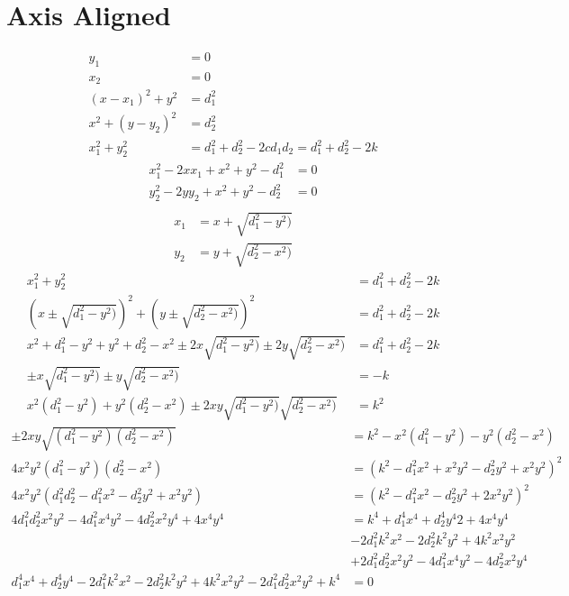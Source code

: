 \documentclass{article}
\begin{document}
\section{Axis Aligned}
\begin{align*}
  y_1 & = 0\\
  x_2 & = 0\\
  (x - x_1)^2 + y^2 &= d_1^2\\
  x^2 + (y - y_2)^2 &= d_2^2\\
  x_1^2 + y_2^2 &= d_1^2 + d_2^2 - 2 c d_1 d_2 = d_1^2 + d_2^2 - 2 k
\end{align*}
\begin{align*}
  x_1^2 - 2 x x_1 + x^2 + y^2 - d_1^2 &= 0\\
  y_2^2 - 2 y y_2 + x^2 + y^2 - d_2^2 &= 0\\
\end{align*}
\begin{align*}
  x_1 &= x + \sqrt{d_1^2 - y^2)}\\
  y_2 &= y + \sqrt{d_2^2 - x^2)}
\end{align*}
\begin{align*}
  x_1^2 + y_2^2 &= d_1^2 + d_2^2 - 2 k\\
  (x \pm \sqrt{d_1^2 - y^2)})^2 + (y \pm \sqrt{d_2^2 - x^2)})^2 &= d_1^2 + d_2^2 - 2 k\\
  x^2 + d_1^2 - y^2 + y^2 + d_2^2 - x^2 \pm 2 x \sqrt{d_1^2 - y^2)} \pm 2 y \sqrt{d_2^2 - x^2)} &= d_1^2 + d_2^2 - 2 k\\
  \pm x \sqrt{d_1^2 - y^2)} \pm y \sqrt{d_2^2 - x^2)} &= -k\\
  x^2 (d_1^2 - y^2) + y^2 (d_2^2 - x^2) \pm 2 x y \sqrt{d_1^2 - y^2)} \sqrt{d_2^2 - x^2)} &= k^2
\end{align*}
\begin{align*}
  \pm 2 x y \sqrt{(d_1^2 - y^2)(d_2^2 - x^2)} &= k^2 - x^2 (d_1^2 - y^2) - y^2 (d_2^2 - x^2)\\
  4 x^2 y^2 (d_1^2 - y^2)(d_2^2 - x^2) &= (k^2 - d_1^2x^2 + x^2y^2 - d_2^2y^2 + x^2y^2)^2\\
  4 x^2 y^2 (d_1^2d_2^2 - d_1^2x^2 - d_2^2y^2 + x^2y^2) &= (k^2 - d_1^2 x^2 - d_2^2 y^2 + 2 x^2 y^2)^2\\
  4 d_1^2d_2^2 x^2 y^2 - 4 d_1^2 x^4 y^2 - 4 d_2^2 x^2 y^4 + 4 x^4 y^4  &= k^4 + d_1^4 x^4 + d_2^4 y^4 2 + 4 x^4 y^4 \\
                                                                    &- 2 d_1^2 k^2 x^2 - 2 d_2^2 k^2 y^2 + 4 k^2 x^2 y^2 \\
                                                                    &+ 2 d_1^2 d_2^2 x^2 y^2 - 4 d_1^2 x^4 y^2 - 4 d_2^2 x^2 y^4 \\
  d_1^4 x^4 + d_2^4 y^4 - 2 d_1^2 k^2 x^2 - 2 d_2^2 k^2 y^2 + 4 k^2 x^2 y^2 - 2 d_1^2d_2^2 x^2 y^2 + k^4 &= 0
\end{align*}
\end{document}
